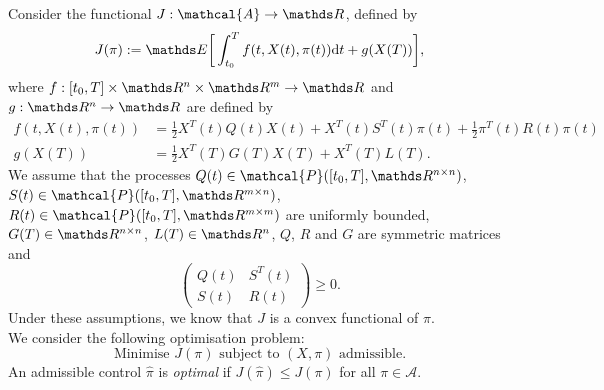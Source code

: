 Consider the functional $J : \mathcal{A} \to \R$, defined by
\begin{equation}
    J(\pi) := \E \bigg[ \int_{t_0}^T f(t, X(t), \pi(t)) \d t + g(X(T))\bigg],
    \label{eq: cost_func}
\end{equation}
where $f: [t_0, T] \times \R^n \times \R^m \to \R$ and $g: \R^n \to \R$ are defined by
\begin{align}
    f(t, X(t), \pi(t)) &= \frac12 X^T(t) Q(t) X(t) + X^T(t) S^T(t) \pi(t) + \frac12 \pi^T(t) R(t) \pi(t) \label{eq: f}\\
    g(X(T)) &= \frac12 X^T(T) G(T) X(T) + X^T(T) L(T). \label{eq: g}
\end{align}
We assume that the processes $Q(t) \in \mathcal{P}([t_0, T], \R^{n \times n})$, $S(t) \in \mathcal{P}([t_0, T], \R^{m \times n})$, $R(t) \in \mathcal{P}([t_0, T], \R^{m \times m})$ are uniformly bounded, $G(T) \in \R^{n \times n}$, $L(T) \in \R^{n}$, $Q$, $R$ and $G$ are symmetric matrices and
\begin{equation*}
    \begin{pmatrix}
        Q(t) & S^T(t)\\
        S(t) & R(t)
    \end{pmatrix}
    \ge 0.
\end{equation*}
Under these assumptions, we know that $J$ is a convex functional of $\pi$.\\

We consider the following optimisation problem:
\begin{equation}
    \text{Minimise } J(\pi) \text{ subject to } (X, \pi) \text{ admissible}. \label{eq: minimisation_problem}
\end{equation}
An admissible control $\hat{\pi}$ is \textit{optimal} if $J(\hat{\pi}) \le J(\pi)$ for all $\pi \in \mathcal{A}$.




